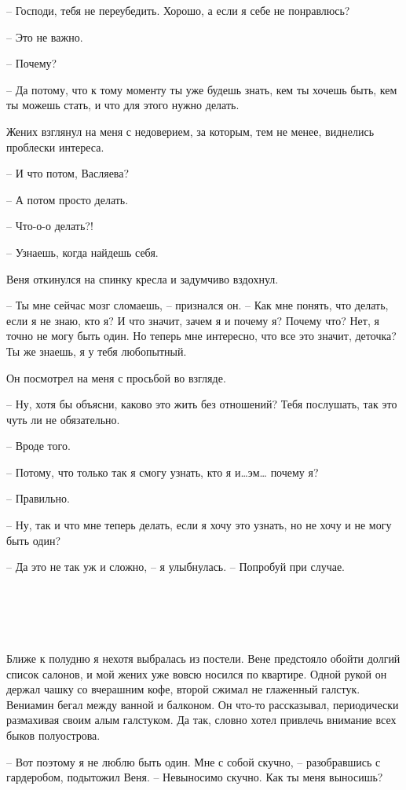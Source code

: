 \documentclass[
]{book}
\begin{document}
-- Господи, тебя не переубедить. Хорошо, а если я себе не понравлюсь?

-- Это не важно.

-- Почему?

-- Да потому, что к тому моменту ты уже будешь знать, кем ты хочешь быть, кем ты можешь стать, и что для этого нужно делать.

Жених взглянул на меня с недоверием, за которым, тем не менее, виднелись проблески интереса.

-- И что потом, Васляева?

-- А потом просто делать.

-- Что-о-о делать?!

-- Узнаешь, когда найдешь себя.

Веня откинулся на спинку кресла и задумчиво вздохнул.

-- Ты мне сейчас мозг сломаешь, -- признался он. -- Как мне понять, что делать, если я не знаю, кто я? И что значит, зачем я и почему я? Почему что? Нет, я точно не могу быть один. Но теперь мне интересно, что все это значит, деточка? Ты же знаешь, я у тебя любопытный.

Он посмотрел на меня с просьбой во взгляде.

-- Ну, хотя бы объясни, каково это жить без отношений? Тебя послушать, так это чуть ли не обязательно.

-- Вроде того.

-- Потому, что только так я смогу узнать, кто я и\ldots эм\ldots{} почему я?

-- Правильно.

-- Ну, так и что мне теперь делать, если я хочу это узнать, но не хочу и не могу быть один?

-- Да это не так уж и сложно, -- я улыбнулась. -- Попробуй при случае.

\hypertarget{chapter-16}{%
\chapter{~}\label{chapter-16}}

Ближе к полудню я нехотя выбралась из постели. Вене предстояло обойти долгий список салонов, и мой жених уже вовсю носился по квартире. Одной рукой он держал чашку со вчерашним кофе, второй сжимал не глаженный галстук. Вениамин бегал между ванной и балконом. Он что-то рассказывал, периодически размахивая своим алым галстуком. Да так, словно хотел привлечь внимание всех быков полуострова.

-- Вот поэтому я не люблю быть один. Мне с собой скучно, -- разобравшись с гардеробом, подытожил Веня. -- Невыносимо скучно. Как ты меня выносишь?
\end{document}
